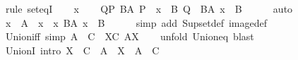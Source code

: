 \begin{isabellebody}
%
\isadelimproof
%
\endisadelimproof
%
\isatagproof
{}\isamarkupfalse%
\ {\isacharparenleft}{\kern0pt}rule\ set{\isacharunderscore}{\kern0pt}eqI{\isacharparenright}{\kern0pt}\isanewline
\ \ \isamarkupfalse%
\ x\isanewline
\ \ \isamarkupfalse%
\ {\isachardoublequoteopen}{\isacharparenleft}{\kern0pt}{\isasymexists}Q{\isasymin}{\isacharbraceleft}{\kern0pt}P{\isachardot}{\kern0pt}\ {\isasymexists}B{\isasymin}A{\isachardot}{\kern0pt}\ P\ {\isasymlongleftrightarrow}\ x\ {\isasymin}\ B{\isacharbraceright}{\kern0pt}{\isachardot}{\kern0pt}\ Q{\isacharparenright}{\kern0pt}\ {\isasymlongleftrightarrow}\ {\isacharparenleft}{\kern0pt}{\isasymexists}B{\isasymin}A{\isachardot}{\kern0pt}\ x\ {\isasymin}\ B{\isacharparenright}{\kern0pt}{\isachardoublequoteclose}\isanewline
\ \ \ \ \isamarkupfalse%
\ auto\isanewline
\ \ \isamarkupfalse%
\ \isamarkupfalse%
\ {\isachardoublequoteopen}x\ {\isasymin}\ {\isasymUnion}A\ {\isasymlongleftrightarrow}\ x\ {\isasymin}\ {\isacharbraceleft}{\kern0pt}x{\isachardot}{\kern0pt}\ {\isasymexists}B{\isasymin}A{\isachardot}{\kern0pt}\ x\ {\isasymin}\ B{\isacharbraceright}{\kern0pt}{\isachardoublequoteclose}\isanewline
\ \ \ \ \isamarkupfalse%
\ {\isacharparenleft}{\kern0pt}simp\ add{\isacharcolon}{\kern0pt}\ Sup{\isacharunderscore}{\kern0pt}set{\isacharunderscore}{\kern0pt}def\ image{\isacharunderscore}{\kern0pt}def{\isacharparenright}{\kern0pt}\isanewline
{}\isamarkupfalse%
%
\endisatagproof
{\isafoldproof}%
%
\isadelimproof
\isanewline
%
\endisadelimproof
\isanewline
{}\isamarkupfalse%
\ Union{\isacharunderscore}{\kern0pt}iff\ {\isacharbrackleft}{\kern0pt}simp{\isacharbrackright}{\kern0pt}{\isacharcolon}{\kern0pt}\ {\isachardoublequoteopen}A\ {\isasymin}\ {\isasymUnion}C\ {\isasymlongleftrightarrow}\ {\isacharparenleft}{\kern0pt}{\isasymexists}X{\isasymin}C{\isachardot}{\kern0pt}\ A{\isasymin}X{\isacharparenright}{\kern0pt}{\isachardoublequoteclose}\isanewline
%
\isadelimproof
\ \ %
\endisadelimproof
%
\isatagproof
{}\isamarkupfalse%
\ {\isacharparenleft}{\kern0pt}unfold\ Union{\isacharunderscore}{\kern0pt}eq{\isacharparenright}{\kern0pt}\ blast%
\endisatagproof
{\isafoldproof}%
%
\isadelimproof
\isanewline
%
\endisadelimproof
\isanewline
{}\isamarkupfalse%
\ UnionI\ {\isacharbrackleft}{\kern0pt}intro{\isacharbrackright}{\kern0pt}{\isacharcolon}{\kern0pt}\ {\isachardoublequoteopen}X\ {\isasymin}\ C\ {\isasymLongrightarrow}\ A\ {\isasymin}\ X\ {\isasymLongrightarrow}\ A\ {\isasymin}\ {\isasymUnion}C{\isachardoublequoteclose}\isanewline

\end{isabellebody}
